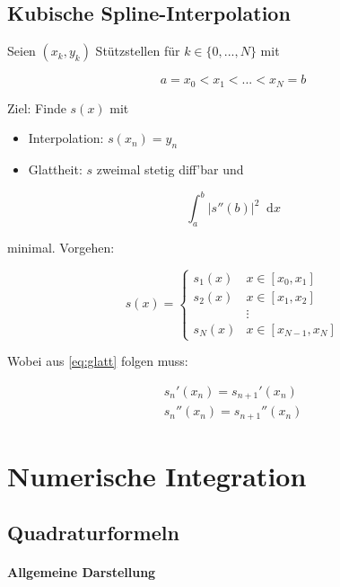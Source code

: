 \documentclass[a4paper, 14pt]{article}
\newcommand*\diff{\mathop{}\!\mathrm{d}}
\begin{document}
	\subsection{Kubische Spline-Interpolation}

	Seien $(x_k, y_k)$ Stützstellen für $k \in \{ 0, ..., N \}$ mit

	\begin{equation}
		a = x_0 < x_1 < ... < x_N = b
	\end{equation}

	Ziel: Finde $s(x)$ mit

	\begin{itemize}
		\item Interpolation: $s(x_n) = y_n$
		\item Glattheit: $s$ zweimal stetig diff'bar und
	\end{itemize}

	\begin{equation} \label{eq:glatt}
		\int_a^b{|s''(b)|^2 \diff x}
	\end{equation}

	minimal.
	Vorgehen:

	\begin{equation}
		s(x) = \begin{cases}
			s_1(x) & x \in [x_0, x_1] \\
			s_2(x) & x \in [x_1, x_2] \\
			& \vdots \\
			s_N(x) & x \in [x_{N-1}, x_N]
		\end{cases}
	\end{equation}

	Wobei aus \ref{eq:glatt} folgen muss:

	\begin{align}
		s_n'(x_n) = s_{n + 1}'(x_n) \\
		s_n''(x_n) = s_{n + 1}''(x_n)
	\end{align}

	\section{Numerische Integration}

	\subsection{Quadraturformeln}

	\paragraph{Allgemeine Darstellung}
\end{document}
